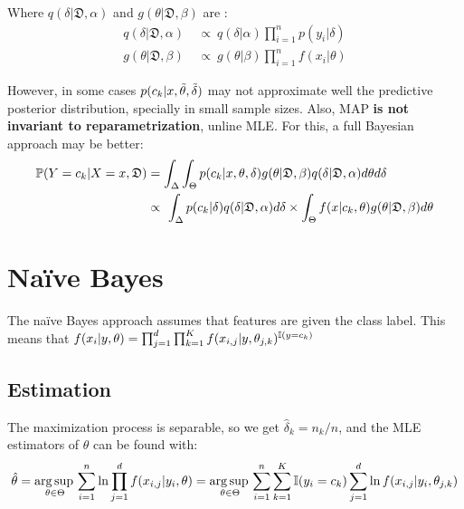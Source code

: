 Where $q(\delta|\mathfrak{D},\alpha)$ and $g(\theta|\mathfrak{D},\beta)$ are :
\begin{align*}
    q(\delta|\mathfrak{D},\alpha)\ & \propto\ q(\delta|\alpha)\prod_{i=1}^n p(y_i|\delta)\\    g(\theta|\mathfrak{D},\beta)\ & \propto\  g(\theta|\beta)\prod_{i=1}^n f(x_i|\theta)
\end{align*}

However, in some cases $p(c_k|x,\Tilde{\theta},\Tilde{\delta}) $ may not approximate well the predictive posterior distribution, specially in small sample sizes. Also, MAP \textbf{is not invariant to reparametrization}, unline MLE. For this, a full Bayesian approach may be better:
\begin{align*}
    \operatorname{\mathbb{P}}(Y=c_k|X=x,\mathfrak{D}) &=\int_{\Delta}\int_{\Theta}p(c_k|x,\theta,\delta)g(\theta|\mathfrak{D},\beta)q(\delta|\mathfrak{D},\alpha)d\theta d\delta \\
    &\propto\ \int_{\Delta} p(c_k|\delta)q(\delta|\mathfrak{D},\alpha) d\delta\times \int_{\Theta}f(x|c_k,\theta) g(\theta|\mathfrak{D},\beta) d\theta
\end{align*}





\section{Naïve Bayes}
The naïve Bayes approach assumes that features are  given the class label. This means that $f(x_i|y,\theta)=\prod_{j=1}^d\prod_{k=1}^K  f(x_{i,j}|y,\theta_{j,k})^{\operatorname{\mathbb{I}}(y=c_k)}$

\subsection{Estimation}

The maximization process is separable, so we get $\hat{\delta}_{k}=n_k/n$, and the MLE estimators of $\theta$ can be found with:
\begin{equation*}
    \hat{\theta}  = \operatorname*{arg\,sup\,}_{\theta\in\Theta} \sum_{i=1}^n\ln\prod_{j=1}^d f(x_{i,j}|y_i,\theta) = \operatorname*{arg\,sup\,}_{\theta\in\Theta} \sum_{i=1}^n\sum_{k=1}^K\operatorname{\mathbb{I}}(y_i=c_k)\sum_{j=1}^d\ln f(x_{i,j}|y_i,\theta_{j,k})
\end{equation*}


